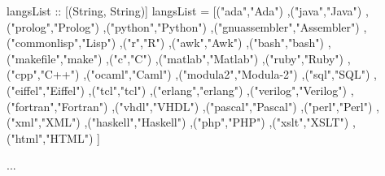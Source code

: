 \documentclass[letterpaper]{scrartcl}
\newenvironment{Shaded}{\begin{snugshade}}{\end{snugshade}}
\newcommand{\DataTypeTok}[1]{\textcolor[rgb]{0.87,0.87,0.75}{{#1}}}
\newcommand{\StringTok}[1]{\textcolor[rgb]{0.80,0.58,0.58}{{#1}}}
\newcommand{\OtherTok}[1]{\textcolor[rgb]{0.94,0.94,0.56}{{#1}}}
\newcommand{\FunctionTok}[1]{\textcolor[rgb]{0.94,0.94,0.56}{{#1}}}
\newcommand{\NormalTok}[1]{\textcolor[rgb]{0.80,0.80,0.80}{{#1}}}
\begin{document}
\begin{Shaded}
\begin{Highlighting}[]
\OtherTok{langsList ::} \NormalTok{[(}\DataTypeTok{String}\NormalTok{, }\DataTypeTok{String}\NormalTok{)]}
\NormalTok{langsList }\FunctionTok{=}    \NormalTok{[(}\StringTok{"ada"}\NormalTok{,}\StringTok{"Ada"}\NormalTok{)}
               \NormalTok{,(}\StringTok{"java"}\NormalTok{,}\StringTok{"Java"}\NormalTok{)}
               \NormalTok{,(}\StringTok{"prolog"}\NormalTok{,}\StringTok{"Prolog"}\NormalTok{)}
               \NormalTok{,(}\StringTok{"python"}\NormalTok{,}\StringTok{"Python"}\NormalTok{)}
               \NormalTok{,(}\StringTok{"gnuassembler"}\NormalTok{,}\StringTok{"Assembler"}\NormalTok{)}
               \NormalTok{,(}\StringTok{"commonlisp"}\NormalTok{,}\StringTok{"Lisp"}\NormalTok{)}
               \NormalTok{,(}\StringTok{"r"}\NormalTok{,}\StringTok{"R"}\NormalTok{)}
               \NormalTok{,(}\StringTok{"awk"}\NormalTok{,}\StringTok{"Awk"}\NormalTok{)}
               \NormalTok{,(}\StringTok{"bash"}\NormalTok{,}\StringTok{"bash"}\NormalTok{)}
               \NormalTok{,(}\StringTok{"makefile"}\NormalTok{,}\StringTok{"make"}\NormalTok{)}
               \NormalTok{,(}\StringTok{"c"}\NormalTok{,}\StringTok{"C"}\NormalTok{)}
               \NormalTok{,(}\StringTok{"matlab"}\NormalTok{,}\StringTok{"Matlab"}\NormalTok{)}
               \NormalTok{,(}\StringTok{"ruby"}\NormalTok{,}\StringTok{"Ruby"}\NormalTok{)}
               \NormalTok{,(}\StringTok{"cpp"}\NormalTok{,}\StringTok{"C++"}\NormalTok{)}
               \NormalTok{,(}\StringTok{"ocaml"}\NormalTok{,}\StringTok{"Caml"}\NormalTok{)}
               \NormalTok{,(}\StringTok{"modula2"}\NormalTok{,}\StringTok{"Modula-2"}\NormalTok{)}
               \NormalTok{,(}\StringTok{"sql"}\NormalTok{,}\StringTok{"SQL"}\NormalTok{)}
               \NormalTok{,(}\StringTok{"eiffel"}\NormalTok{,}\StringTok{"Eiffel"}\NormalTok{)}
               \NormalTok{,(}\StringTok{"tcl"}\NormalTok{,}\StringTok{"tcl"}\NormalTok{)}
               \NormalTok{,(}\StringTok{"erlang"}\NormalTok{,}\StringTok{"erlang"}\NormalTok{)}
               \NormalTok{,(}\StringTok{"verilog"}\NormalTok{,}\StringTok{"Verilog"}\NormalTok{)}
               \NormalTok{,(}\StringTok{"fortran"}\NormalTok{,}\StringTok{"Fortran"}\NormalTok{)}
               \NormalTok{,(}\StringTok{"vhdl"}\NormalTok{,}\StringTok{"VHDL"}\NormalTok{)}
               \NormalTok{,(}\StringTok{"pascal"}\NormalTok{,}\StringTok{"Pascal"}\NormalTok{)}
               \NormalTok{,(}\StringTok{"perl"}\NormalTok{,}\StringTok{"Perl"}\NormalTok{)}
               \NormalTok{,(}\StringTok{"xml"}\NormalTok{,}\StringTok{"XML"}\NormalTok{)}
               \NormalTok{,(}\StringTok{"haskell"}\NormalTok{,}\StringTok{"Haskell"}\NormalTok{)}
               \NormalTok{,(}\StringTok{"php"}\NormalTok{,}\StringTok{"PHP"}\NormalTok{)}
               \NormalTok{,(}\StringTok{"xslt"}\NormalTok{,}\StringTok{"XSLT"}\NormalTok{)}
               \NormalTok{,(}\StringTok{"html"}\NormalTok{,}\StringTok{"HTML"}\NormalTok{)}
               \NormalTok{]}

\FunctionTok{...}
\end{Highlighting}
\end{Shaded}
\end{document}
